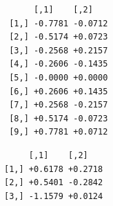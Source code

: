 \documentclass[
  12pt,
  letterpaper,
  DIV=11,
  numbers=noendperiod]{scrartcl}
\newenvironment{Shaded}{\begin{snugshade}}{\end{snugshade}}
\newcommand{\AttributeTok}[1]{\textcolor[rgb]{0.40,0.45,0.13}{#1}}
\newcommand{\DecValTok}[1]{\textcolor[rgb]{0.68,0.00,0.00}{#1}}
\newcommand{\FunctionTok}[1]{\textcolor[rgb]{0.28,0.35,0.67}{#1}}
\newcommand{\NormalTok}[1]{\textcolor[rgb]{0.00,0.23,0.31}{#1}}
\newcommand{\OtherTok}[1]{\textcolor[rgb]{0.00,0.23,0.31}{#1}}
\newcommand{\SpecialCharTok}[1]{\textcolor[rgb]{0.37,0.37,0.37}{#1}}
\begin{document}
\begin{Shaded}
\end{Shaded}

\begin{verbatim}
      [,1]    [,2]   
 [1,] -0.7781 -0.0712
 [2,] -0.5174 +0.0723
 [3,] -0.2568 +0.2157
 [4,] -0.2606 -0.1435
 [5,] -0.0000 +0.0000
 [6,] +0.2606 +0.1435
 [7,] +0.2568 -0.2157
 [8,] +0.5174 -0.0723
 [9,] +0.7781 +0.0712
\end{verbatim}

\begin{Shaded}
\end{Shaded}

\begin{verbatim}
     [,1]    [,2]   
[1,] +0.6178 +0.2718
[2,] +0.5401 -0.2842
[3,] -1.1579 +0.0124
\end{verbatim}
\end{document}
